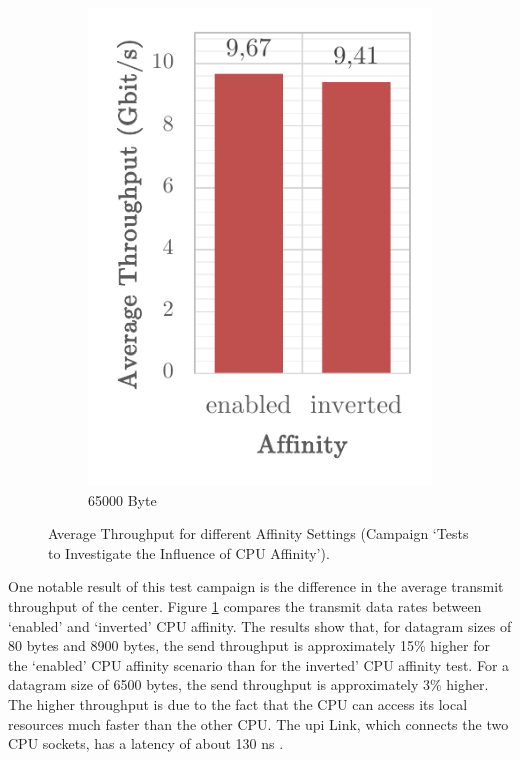 \begin{figure}[h]
\begin{subfigure}[b]{0.32\textwidth}
        \includegraphics[width=\textwidth]{figures/reliability/ihawk/diagr10c.pdf}
        \caption{65000 Byte}
    \end{subfigure}
    \caption{Average Throughput for different Affinity Settings (Campaign `Tests to Investigate the Influence of \ac{CPU} Affinity').}
    \label{fig:diagr10Throuhput}
\end{figure}

One notable result of this test campaign is the difference in the average transmit throughput of the center. Figure \ref{fig:diagr10Throuhput} compares the transmit data rates between `enabled' and `inverted' \ac{CPU} affinity. The results show that, for datagram sizes of 80 bytes and 8900 bytes, the send throughput is approximately 15\% higher for the `enabled' \ac{CPU} affinity scenario than for the inverted' \ac{CPU} affinity test. For a datagram size of 6500 bytes, the send throughput is approximately 3\% higher. The higher throughput is due to the fact that the \ac{CPU} can access its local resources much faster than the other \ac{CPU}. The \ac{upi} Link, which connects the two \ac{CPU} sockets, has a latency of about 130 ns \cite{setup07}.


